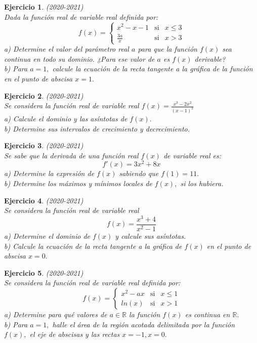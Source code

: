 \documentclass[12pt, a4paper]{amsart}
\newtheorem{ejer}{Ejercicio}
\begin{document}
\begin{ejer}\em (2020-2021)\\
Dada la función real de variable real definida por:
\[
f(x)=\left \{ \begin{matrix}
x^2-x-1  & \text{si} & x\leq 3\\
\frac{3a}{x} & \text{si} & x> 3
\end{matrix}\right.
\]
a) Determine el valor del parámetro real $a$ para que la función $f(x)$ sea continua en todo su dominio. ¿Para ese valor de $a$ es $f(x)$ derivable?\\
b) Para $a=1,$ calcule la ecuación de la recta tangente a la gráfica de la función en el punto de abscisa $x=1.$
\end{ejer}

\begin{ejer}\em (2020-2021)\\
Se considera la función real de variable real $f(x)=\frac{x^3-2x^2}{(x-1)^2}$\\
a) Calcule el dominio y las asíntotas de $f(x).$\\
b) Determine sus intervalos de crecimiento y decrecimiento.
\end{ejer}

\begin{ejer}\em (2020-2021)\\
Se sabe que la derivada de una función real $f(x)$ de variable real es:
\[f'(x)=3x^2+8x\]
a) Determine la expresión de $f(x)$ sabiendo que $f(1)=11.$\\
b) Determine los máximos y mínimos locales de $f(x),$ si los hubiera.
\end{ejer}

\begin{ejer}\em (2020-2021)\\
Se considera la función real de variable real 
\[f(x)=\frac{x^3+4}{x^2-1}\]
a) Determine el dominio de $f(x)$ y calcule sus asíntotas.\\
b) Calcule la ecuación de la recta tangente a la gráfica de $f(x)$ en el punto de abscisa $x=0.$
\end{ejer}

\begin{ejer}\em (2020-2021)\\
Se considera la función real de variable real definida por:
\[
f(x)=\left \{ \begin{matrix}
x^2-ax & \text{si} & x\leq 1\\
ln(x) & \text{si} & x> 1
\end{matrix}\right.
\]
a) Determine para qué valores de $a\in\mathbb{R}$ la función $f(x)$ es continua en $\mathbb{R}.$\\
b) Para $a=1,$ halle el área de la región acotada delimitada por la función $f(x),$ el eje de abscisas y las rectas $x=-1, x=0.$ 
\end{ejer}
\end{document}
